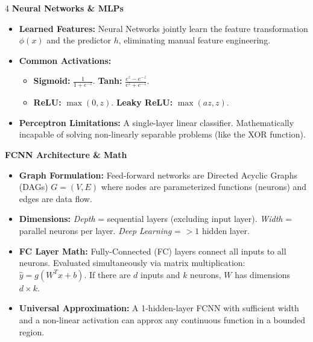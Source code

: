 \documentclass[8pt,landscape,a4paper]{extarticle}
\begin{document}
\begin{multicols*}{4}
\newpage
\noindent\textbf{Neural Networks \& MLPs}
\begin{itemize}[leftmargin=*, nosep]
    \item \textbf{Learned Features:} Neural Networks jointly learn the feature transformation $\phi(x)$ and the predictor $h$, eliminating manual feature engineering.
    \item \textbf{Common Activations:} 
    \begin{itemize}[leftmargin=*, nosep]
        \item \textbf{Sigmoid:} $\frac{1}{1+e^{-z}}$. \textbf{Tanh:} $\frac{e^z-e^{-z}}{e^z+e^{-z}}$. 
        \item \textbf{ReLU:} $\max(0,z)$. \textbf{Leaky ReLU:} $\max(az, z)$.
    \end{itemize}
    \item \textbf{Perceptron Limitations:} A single-layer linear classifier. Mathematically incapable of solving non-linearly separable problems (like the XOR function).
\end{itemize}

    \vspace{1mm}
\noindent\textbf{FCNN Architecture \& Math}
\begin{itemize}[leftmargin=*, nosep]
    \item \textbf{Graph Formulation:} Feed-forward networks are Directed Acyclic Graphs (DAGs) $G=(V,E)$ where nodes are parameterized functions (neurons) and edges are data flow.
    \item \textbf{Dimensions:} \textit{Depth} = sequential layers (excluding input layer). \textit{Width} = parallel neurons per layer. \textit{Deep Learning} = $>1$ hidden layer.
    \item \textbf{FC Layer Math:} Fully-Connected (FC) layers connect all inputs to all neurons. Evaluated simultaneously via matrix multiplication: $\hat{y} = g(W^T x + b)$. If there are $d$ inputs and $k$ neurons, $W$ has dimensions $d \times k$.
    \item \textbf{Universal Approximation:} A 1-hidden-layer FCNN with sufficient width and a non-linear activation can approx any continuous function in a bounded region.
\end{itemize}


\end{multicols*}
\end{document}
